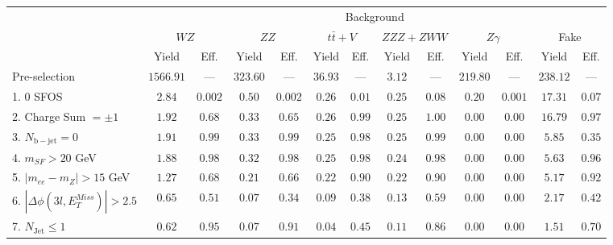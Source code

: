 \begin{tabular}{l||c|c||c|c||c|c||c|c||c|c||c|c}
\hline
 &  \multicolumn{12}{c||}{Background} \\
 & \multicolumn{2}{c||}{$WZ$} & \multicolumn{2}{c||}{$ZZ$} & \multicolumn{2}{c||}{$t\bar{t}+V$} & \multicolumn{2}{c||}{$ZZZ+ZWW$} & \multicolumn{2}{c||}{$Z\gamma$} & \multicolumn{2}{c||}{Fake}  \\ 
 & Yield & Eff. & Yield & Eff. & Yield & Eff. & Yield & Eff. & Yield & Eff. & Yield & Eff. \\
\hline\hline
Pre-selection &  $1566.91$ & --- &  $323.60$ &  --- &  $36.93$ &  --- &  $3.12$ & --- &  $219.80$ &  --- &  $238.12$ &  --- \\ 
\hline
1. 0 SFOS &  $2.84$ &  $0.002$ &  $0.50$ &  $0.002$ &  $0.26$ &  $0.01$ &  $0.25$ &  $0.08$ &  $0.20$ &  $0.001$ &  $17.31$ &  $0.07$ \\ 
\hline
2. Charge Sum $= \pm 1$ &  $1.92$ &  $0.68$ &  $0.33$ &  $0.65$ &  $0.26$ &  $0.99$ &  $0.25$ &  $1.00$ &  $0.00$ &  $0.00$ &  $16.79$ &  $0.97$ \\ 
\hline
3. $N_{\mathrm{b-jet}} = 0$ &  $1.91$ &  $0.99$ &  $0.33$ &  $0.99$ &  $0.25$ &  $0.98$ &  $0.25$ &  $0.99$ &  $0.00$ &  $0.00$ &  $5.85$ &  $0.35$ \\ 
\hline
4. $m_{SF} > 20$ GeV &  $1.88$ &  $0.98$ &  $0.32$ &  $0.98$ &  $0.25$ &  $0.98$ &  $0.24$ &  $0.98$ &  $0.00$ &  $0.00$ &  $5.63$ &  $0.96$ \\ 
\hline
5. $|m_{ee} - m_{Z}| > 15$ GeV &  $1.27$ &  $0.68$ &  $0.21$ &  $0.66$ &  $0.22$ &  $0.90$ &  $0.22$ &  $0.90$ &  $0.00$ &  $0.00$ &  $5.17$ &  $0.92$ \\ 
\hline
6. $|\Delta\phi(3l,E_{T}^{Miss})| > 2.5$ &  $0.65$ &  $0.51$ &  $0.07$ &  $0.34$ &  $0.09$ &  $0.38$ &  $0.13$ &  $0.59$ &  $0.00$ &  $0.00$ &  $2.17$ &  $0.42$ \\ 
\hline
7. $N_{\mathrm{Jet}} \leq 1$ &  $0.62$ &  $0.95$ &  $0.07$ &  $0.91$ &  $0.04$ &  $0.45$ &  $0.11$ &  $0.86$ &  $0.00$ &  $0.00$ &  $1.51$ &  $0.70$ \\ 
\hline
\end{tabular}




